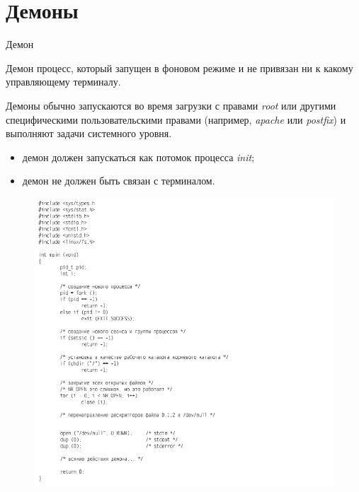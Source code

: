 \documentclass[xcolor=table]{beamer}
\begin{document}
\section{Демоны}

\begin{frame}{Демон}
	\begin{block}{Демон}
		процесс, который запущен в фоновом режиме и не привязан ни к какому управляющему терминалу.
	\end{block}
	Демоны обычно запускаются во время загрузки с правами \textit{root} или другими специфическими пользовательскими правами (например, \textit{apache} или \textit{postfix}) и выполняют задачи системного уровня. 
	\begin{itemize}
		\item демон должен запускаться как потомок процесса \textit{init};
		\item демон не должен быть связан с терминалом.
	\end{itemize}
\end{frame}

\begin{frame}
	\begin{figure}[h]
		\centering
		\includegraphics[scale=0.4]{images/lec07-pic16.png}
	\end{figure}
\end{frame}
\end{document}
